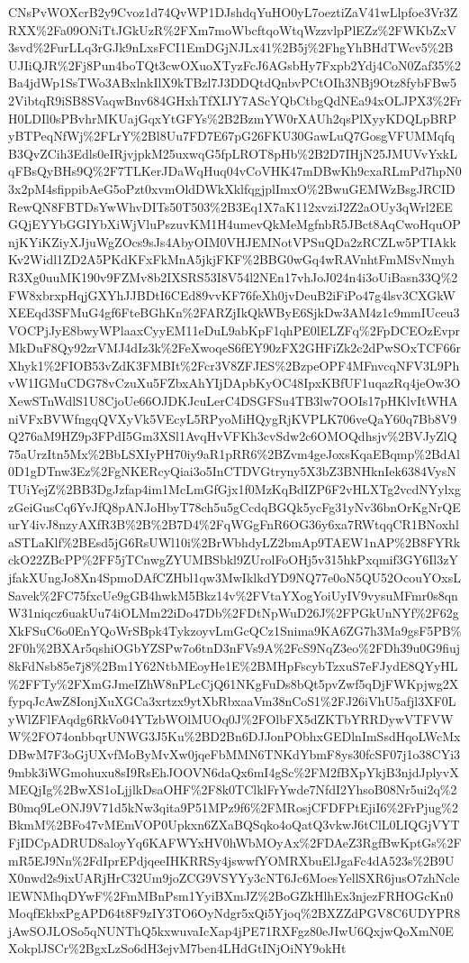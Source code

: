 \documentclass[11pt]{article}
\begin{document}
CNsPvWOXcrB2y9Cvoz1d74QvWP1DJshdqYuHO0yL7oeztiZaV41wLlpfoe3Vr3ZRXX\%2Fa09ONiTtJGkUzR\%2FXm7moWbcftqoWtqWzzvlpPlEZz\%2FWKbZxV3svd\%2FurLLq3rGJk9nLxsFCI1EmDGjNJLx41\%2B5j\%2FhgYhBHdTWcv5\%2BUJIiQJR\%2Fj8Pun4boTQt3cwOXuoXTyzFcJ6AGsbHy7Fxpb2Ydj4CoN0Zaf35\%2Ba4jdWp1SsTWo3ABxlnkIlX9kTBzl7J3DDQtdQnbvPCtOIh3NBj9Otz8fybFBw52VibtqR9iSB8SVaqwBnv684GHxhTfXIJY7AScYQbCtbgQdNEa94xOLJPX3\%2FrH0LDIl0sPBvhrMKUajGqxYtGFYs\%2B2BzmYW0rXAUh2qsPlXyyKDQLpBRPyBTPeqNfWj\%2FLrY\%2Bl8Uu7FD7E67pG26FKU30GawLuQ7GosgVFUMMqfqB3QvZCih3Edls0eIRjvjpkM25uxwqG5fpLROT8pHb\%2B2D7IHjN25JMUVvYxkLqFBsQyBHs9Q\%2F7TLKerJDaWqHuq04vCoVHK47mDBwKh9cxaRLmPd7hpN03x2pM4sfippibAeG5oPzt0xvmOldDWkXklfqgjplImxO\%2BwuGEMWzBsgJRCIDRewQN8FBTDsYwWhvDITs50T503\%2B3Eq1X7aK112xvziJ2Z2aOUy3qWrl2EEGQjEYYbGGIYbXiWjVluPszuvKM1H4umevQkMeMgfnbR5JBct8AqCwoHquOPnjKYiKZiyXJjuWgZOcs9sJs4AbyOIM0VHJEMNotVPSuQDa2zRCZLw5PTIAkkKv2Widl1ZD2A5PKdKFxFkMnA5jkjFKF\%2BBG0wGq4wRAVnhtFmMSvNmyhR3Xg0uuMK190v9FZMv8b2IXSRS53I8V54l2NEn17vhJoJ024n4i3oUiBasn33Q\%2FW8xbrxpHqjGXYhJJBDtI6CEd89vvKF76feXh0jvDeuB2iFiPo47g4lsv3CXGkWXEEqd3SFMuG4gf6FteBGhKn\%2FARZjIkQkWByE6SjkDw3AM4z1c9mmIUceu3VOCPjJyE8bwyWPlaaxCyyEM11eDuL9abKpF1qhPE0lELZFq\%2FpDCEOzEvprMkDuF8Qy92zrVMJ4dIz3k\%2FeXwoqeS6fEY90zFX2GHFiZk2c2dPwSOxTCF66rXhyk1\%2FIOB53vZdK3FMBIt\%2Fcr3V8ZFJES\%2BzpeOPF4MFnvcqNFV3L9PhvW1IGMuCDG78vCzuXu5FZbxAhYIjDApbKyOC48IpxKBfUF1uqazRq4jeOw3OXewSTnWdlS1U8CjoUe66OJDKJcuLerC4DSGFSu4TB3lw7OOIs17pHKlvItWHAniVFxBVWfngqQVXyVk5VEcyL5RPyoMiHQygRjKVPLK706veQaY60q7Bb8V9Q276aM9HZ9p3FPdI5Gm3XSl1AvqHvVFKh3cvSdw2c6OMOQdhsjv\%2BVJyZlQ75aUrzItn5Mx\%2BbLSXIyPH70iy9aR1pRR6\%2BZvm4geJoxsKqaEBqmp\%2BdAl0D1gDTnw3Ez\%2FgNKERcyQiai3o5InCTDVGtryny5X3bZ3BNHknIek6384VysNTUiYejZ\%2BB3DgJzfap4im1McLmGfGjx1f0MzKqBdIZP6F2vHLXTg2vcdNYylxgzGeiGusCq6YvJfQ8pANJoHbyT78ch5u5gCcdqBGQk5ycFg31yNv36bnOrKgNrQEurY4ivJ8nzyAXfR3B\%2B\%2B7D4\%2FqWGgFnR6OG36y6xa7RWtqqCR1BNoxhlaSTLaKlf\%2BEsd5jG6RsUWl10i\%2BrWbhdyLZ2bmAp9TAEW1nAP\%2B8FYRkckO22ZBcPP\%2FF5jTCnwgZYUMBSbkl9ZUrolFoOHj5v315hkPxqmif3GY6Il3zYjfakXUngJo8Xn4SpmoDAfCZHbl1qw3MwIklkdYD9NQ77e0oN5QU52OcouYOxsLSavek\%2FC75fxcUe9gGB4hwkM5Bkz14v\%2FVtaYXogYoiUyIV9vysuMFmr0s8qnW31niqcz6uakUu74iOLMm22iDo47Db\%2FDtNpWuD26J\%2FPGkUnNYf\%2F62gXkFSuC6o0EnYQoWrSBpk4TykzoyvLmGcQCz1Snima9KA6ZG7h3Ma9gsF5PB\%2F0h\%2BXAr5qshiOGbYZSPw7o6tnD3nFVs9A\%2FcS9NqZ3eo\%2FDh39u0G9fiuj8kFdNsb85e7j8\%2Bm1Y62NtbMEoyHe1E\%2BMHpFscybTzxuS7eFJydE8QYyHL\%2FFTy\%2FXmGJmeIZhW8nPLcCjQ61NKgFuDs8bQt5pvZwf5qDjFWKpjwg2XfypqJcAwZ8IonjXuXGCa3xrtzx9ytXbRbxaaVm38nCoS1\%2FJ26iVhU5afjl3XF0LyWlZFlFAqdg6RkVo04YTzbWOlMUOq0J\%2FOlbFX5dZKTbYRRDywVTFVWW\%2FO74onbbqrUNWG3J5Ku\%2BD2Bn6DJJonPObhxGEDlnImSsdHqoLWcMxDBwM7F3oGjUXvfMoByMvXw0jqeFbMMN6TNKdYbmF8ys30fcSF07j1o38CYi39mbk3iWGmohuxu8sI9RsEhJOOVN6daQx6mI4gSc\%2FM2fBXpYkjB3njdJplyvXMEQjIg\%2BwXS1oLjjlkDsaOHF\%2F8k0TClklFrYwde7NfdI2YhsoB08Nr5ui2q\%2B0mq9LeONJ9V71d5kNw3qita9P51MPz9f6\%2FMRosjCFDFPtEjiI6\%2FrPjug\%2BkmM\%2BFo47vMEmVOP0Upkxn6ZXaBQSqko4oQatQ3vkwJ6tClL0LIQGjVYTFjIDCpADRUD8aloyYq6KAFWYxHV0hWbMOyAx\%2FDAeZ3RgfBwKptGs\%2FmR5EJ9Nn\%2FdIprEPdjqeeIHKRRSy4jswwfYOMRXbuElJgaFc4dA523s\%2B9UX0nwd2s9ixUARjHrC32Um9joZCG9VSYYy3cNT6Jc6MoesYellSXR6jusO7zhNclelEWNMhqDYwF\%2FmMBnPsm1YyiBXmJZ\%2BoGZkHlhEx3njezFRHOGcKn0MoqfEkbxPgAPD64t8F9zIY3TO6OyNdgr5xQi5Yjoq\%2BXZZdPGV8C6UDYPR8jAwSOJLOSo5qNUNThQ5kxwuvaIcXap4jPE71RXFgz80eJIwU6QxjwQoXmN0EXokplJSCr\%2BgxLzSo6dH3ejvM7ben4LHdGtINjOiNY9okHt
\end{document}
